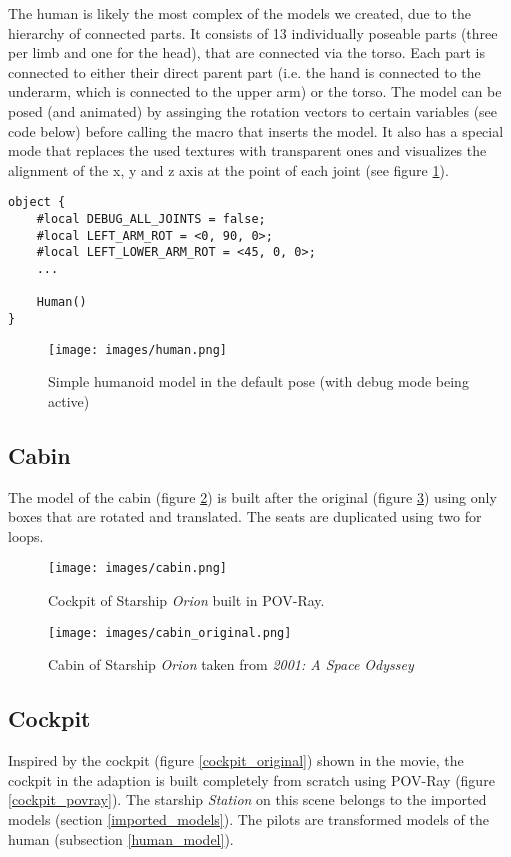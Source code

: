 The human is likely the most complex of the models we created, due to the hierarchy of connected parts.
It consists of 13 individually poseable parts (three per limb and one for the head), that are connected via the torso.
Each part is connected to either their direct parent part (i.e. the hand is connected to the underarm, which is connected to the upper arm) or the torso.
The model can be posed (and animated) by assinging the rotation vectors to certain variables (see code below) before calling the macro that inserts the model.
It also has a special mode that replaces the used textures with transparent ones and visualizes the alignment of the x, y and z axis at the point of each joint (see figure \ref{fig_human}).

\begin{lstlisting}
object {
    #local DEBUG_ALL_JOINTS = false;
    #local LEFT_ARM_ROT = <0, 90, 0>;
    #local LEFT_LOWER_ARM_ROT = <45, 0, 0>;
    ...

    Human()
}
\end{lstlisting}

\begin{figure}[ht]
	\centering
	\texttt{[image: images/human.png]}
	\caption{Simple humanoid model in the default pose (with debug mode being active)}
	\label{fig_human}
\end{figure}

\newpage
\subsection{Cabin}

The model of the cabin (figure \ref{cabin}) is built after the original (figure \ref{cabin_original}) using only boxes that are rotated and translated. The seats are duplicated using two for loops.

\begin{figure}[ht]
	\centering
	\texttt{[image: images/cabin.png]}
	\caption{Cockpit of Starship \textit{Orion} built in POV-Ray.}
	\label{cabin}
\end{figure}

\begin{figure}[ht]
	\centering
	\texttt{[image: images/cabin\_original.png]}
	\caption{Cabin of Starship \textit{Orion} taken from \textit{2001: A Space Odyssey}}
	\label{cabin_original}
\end{figure}

\newpage
\subsection{Cockpit} \label{cockpit_model}
Inspired by the cockpit (figure \ref{cockpit_original}) shown in the movie, the cockpit in the adaption  is built completely from scratch using POV-Ray (figure \ref{cockpit_povray}). The starship \textit{Station} on this scene belongs to the imported models (section \ref{imported_models}).
The pilots are transformed models of the human (subsection \ref{human_model}).

